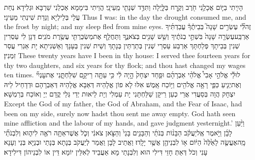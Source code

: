 {הָיִ֧יתִי בַיּ֛וֹם אֲכָלַ֥נִי חֹ֖רֶב וְקֶ֣רַח בַּלָּ֑יְלָה וַתִּדַּ֥ד שְׁנָתִ֖י מֵֽעֵינָֽי׃}
{הֲוֵיתִי בִּימָמָא אַכְלַנִי שַׁרְבָּא וּגְלִידָא נְחַת עֲלַי בְּלֵילְיָא וְנַדַת שִׁינְתִי מֵעֵינָי׃}
{Thus I was: in the day the drought consumed me, and the frost by night; and my sleep fled from mine eyes.}{}
{זֶה\maqqaf לִּ֞י עֶשְׂרִ֣ים שָׁנָה֮ בְּבֵיתֶ֒ךָ֒ עֲבַדְתִּ֜יךָ אַרְבַּֽע\maqqaf עֶשְׂרֵ֤ה שָׁנָה֙ בִּשְׁתֵּ֣י בְנֹתֶ֔יךָ וְשֵׁ֥שׁ שָׁנִ֖ים בְּצֹאנֶ֑ךָ וַתַּחֲלֵ֥ף אֶת\maqqaf מַשְׂכֻּרְתִּ֖י עֲשֶׂ֥רֶת מֹנִֽים׃}
{דְּנָן לִי עַסְרִין שְׁנִין בְּבֵיתָךְ פְּלַחְתָּךְ אַרְבַּע עַסְרֵי שְׁנִין בְּתַרְתֵּין בְּנָתָךְ וְשֵׁית שְׁנִין בְּעָנָךְ וְאַשְׁנִיתָא יָת אַגְרִי עֲסַר זִמְנִין׃}
{These twenty years have I been in thy house: I served thee fourteen years for thy two daughters, and six years for thy flock; and thou hast changed my wages ten times.}{}
{לוּלֵ֡י אֱלֹהֵ֣י אָבִי֩ אֱלֹהֵ֨י אַבְרָהָ֜ם וּפַ֤חַד יִצְחָק֙ הָ֣יָה לִ֔י כִּ֥י עַתָּ֖ה רֵיקָ֣ם שִׁלַּחְתָּ֑נִי אֶת\maqqaf עׇנְיִ֞י וְאֶת\maqqaf יְגִ֧יעַ כַּפַּ֛י רָאָ֥ה אֱלֹהִ֖ים וַיּ֥וֹכַח אָֽמֶשׁ׃}
{אִלּוּ לָא פוֹן אֱלָהֵיהּ דְּאַבָּא אֱלָהֵיהּ דְּאַבְרָהָם וּדְדָחֵיל לֵיהּ יִצְחָק הֲוָה בְּסַעֲדִי אֲרֵי כְעַן רֵיקָן שַׁלַּחְתָּנִי יָת עַמְלִי וְיָת לֵיאוּת יְדַי גְּלֵי קֳדָם יְיָ וְאוֹכַח בְּרַמְשָׁא׃}
{Except the God of my father, the God of Abraham, and the Fear of Isaac, had been on my side, surely now hadst thou sent me away empty. God hath seen mine affliction and the labour of my hands, and gave judgment yesternight.’}{}
{וַיַּ֨עַן לָבָ֜ן וַיֹּ֣אמֶר אֶֽל\maqqaf יַעֲקֹ֗ב הַבָּנ֨וֹת בְּנֹתַ֜י וְהַבָּנִ֤ים בָּנַי֙ וְהַצֹּ֣אן צֹאנִ֔י וְכֹ֛ל אֲשֶׁר\maqqaf אַתָּ֥ה רֹאֶ֖ה לִי\maqqaf ה֑וּא וְלִבְנֹתַ֞י מָֽה\maqqaf אֶעֱשֶׂ֤ה לָאֵ֙לֶּה֙ הַיּ֔וֹם א֥וֹ לִבְנֵיהֶ֖ן אֲשֶׁ֥ר יָלָֽדוּ׃}
{וַאֲתֵיב לָבָן וַאֲמַר לְיַעֲקֹב בְּנָתָא בְּנָתַי וּבְנַיָּא בְּנַי וְעָנָא עָנִי וְכֹל דְּאַתְּ חָזֵי דִּילִי הוּא וְלִבְנָתַי מָא אַעֲבֵיד לְאִלֵּין יוֹמָא דֵּין אוֹ לִבְנֵיהוֹן דִּילִידָא׃}
